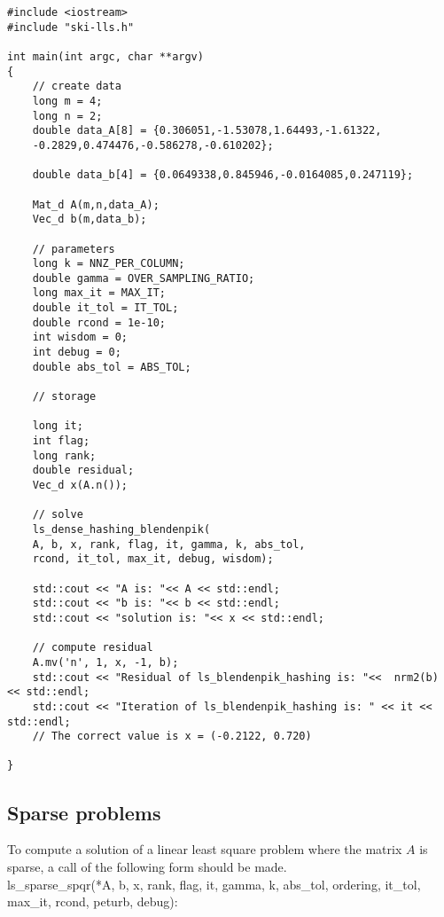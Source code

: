 \documentclass[english,11pt]{article}
\begin{document}
\begin{lstlisting}
#include <iostream>
#include "ski-lls.h" 

int main(int argc, char **argv)
{
	// create data
	long m = 4;
	long n = 2;
	double data_A[8] = {0.306051,-1.53078,1.64493,-1.61322,
	-0.2829,0.474476,-0.586278,-0.610202}; 

	double data_b[4] = {0.0649338,0.845946,-0.0164085,0.247119};

	Mat_d A(m,n,data_A);
	Vec_d b(m,data_b);

	// parameters
	long k = NNZ_PER_COLUMN;
	double gamma = OVER_SAMPLING_RATIO;
	long max_it = MAX_IT;
	double it_tol = IT_TOL;
	double rcond = 1e-10;
	int wisdom = 0;
	int debug = 0;
	double abs_tol = ABS_TOL;

	// storage

	long it;
	int flag;
	long rank;
	double residual;   
	Vec_d x(A.n());

	// solve
	ls_dense_hashing_blendenpik(
	A, b, x, rank, flag, it, gamma, k, abs_tol, 
	rcond, it_tol, max_it, debug, wisdom);

	std::cout << "A is: "<< A << std::endl;
	std::cout << "b is: "<< b << std::endl;
	std::cout << "solution is: "<< x << std::endl;

	// compute residual
	A.mv('n', 1, x, -1, b); 
	std::cout << "Residual of ls_blendenpik_hashing is: "<<  nrm2(b) << std::endl;
	std::cout << "Iteration of ls_blendenpik_hashing is: " << it << std::endl;
	// The correct value is x = (-0.2122, 0.720)

}
\end{lstlisting}


\subsection{Sparse problems}

To compute a solution of a linear least square problem where the matrix $A$ is sparse, a call of the following form should be made. \\

ls_sparse_spqr(*A, b, x, 
    rank, flag, it, gamma, k, abs_tol, ordering, it_tol, max_it, rcond, peturb, debug):
\end{document}

